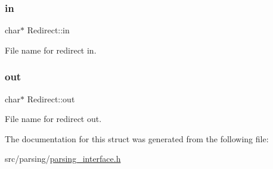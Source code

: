 \subsubsection{\texorpdfstring{in}{in}}
{\footnotesize\ttfamily char$\ast$ Redirect\+::in}

File name for redirect in. \mbox{\label{structRedirect_a9d5efc0a96275e13eba0e71450771952}} 
\subsubsection{\texorpdfstring{out}{out}}
{\footnotesize\ttfamily char$\ast$ Redirect\+::out}

File name for redirect out. 

The documentation for this struct was generated from the following file\+:\begin{DoxyCompactItemize}
\item 
src/parsing/\hyperlink{parsing__interface_8h}{parsing\+\_\+interface.\+h}\end{DoxyCompactItemize}
